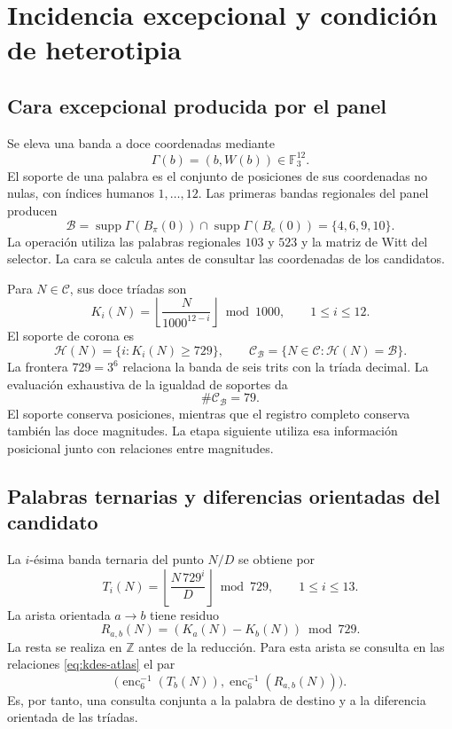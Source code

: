 \section{Incidencia excepcional y condición de heterotipia}

\subsection{Cara excepcional producida por el panel}

Se eleva una banda a doce coordenadas mediante
\[
 \Gamma(b)=(b,W(b))\in\mathbb F_3^{12}.
\]
El soporte de una palabra es el conjunto de posiciones de sus
coordenadas no nulas, con índices humanos $1,\ldots,12$. Las primeras
bandas regionales del panel producen
\begin{equation}
 \mathcal B=\operatorname{supp}\Gamma(B_\pi(0))
          \cap\operatorname{supp}\Gamma(B_e(0))
          =\{4,6,9,10\}.
 \label{eq:kdes-cara}
\end{equation}
La operación utiliza las palabras regionales $103$ y $523$ y la
matriz de Witt del selector. La cara se calcula antes de consultar las
coordenadas de los candidatos.

Para $N\in\mathcal C$, sus doce tríadas son
\begin{equation}
 K_i(N)=\left\lfloor\frac{N}{1000^{12-i}}\right\rfloor\bmod1000,
 \qquad1\leq i\leq12.
 \label{eq:kdes-triadas}
\end{equation}
El soporte de corona es
\[
 \mathcal H(N)=\{i:K_i(N)\geq729\},
 \qquad
 \mathcal C_{\mathcal B}=\{N\in\mathcal C:\mathcal H(N)=\mathcal B\}.
\]
La frontera $729=3^6$ relaciona la banda de seis trits con la tríada
decimal. La evaluación exhaustiva de la igualdad de soportes da
\begin{equation}
 \#\mathcal C_{\mathcal B}=79.
 \label{eq:kdes-79}
\end{equation}
El soporte conserva posiciones, mientras que el registro completo
conserva también las doce magnitudes. La etapa siguiente utiliza esa
información posicional junto con relaciones entre magnitudes.

\subsection{Palabras ternarias y diferencias orientadas del candidato}

La $i$-ésima banda ternaria del punto $N/D$ se obtiene por
\begin{equation}
 T_i(N)=\left\lfloor\frac{N\,729^i}{D}\right\rfloor\bmod729,
 \qquad1\leq i\leq13.
 \label{eq:kdes-tercandidato}
\end{equation}
La arista orientada $a\to b$ tiene residuo
\begin{equation}
 R_{a,b}(N)=(K_a(N)-K_b(N))\bmod729.
 \label{eq:kdes-resarista}
\end{equation}
La resta se realiza en $\mathbb Z$ antes de la reducción. Para esta
arista se consulta en las relaciones \eqref{eq:kdes-atlas} el par
\[
 \bigl(\operatorname{enc}_6^{-1}(T_b(N)),
  \operatorname{enc}_6^{-1}(R_{a,b}(N))\bigr).
\]
Es, por tanto, una consulta
conjunta a la palabra de destino y a la diferencia orientada de las
tríadas.

